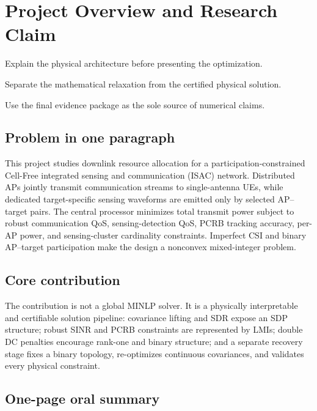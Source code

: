\chapter{Project Overview and Research Claim}

\begin{introduction}
\item Explain the physical architecture before presenting the optimization.
\item Separate the mathematical relaxation from the certified physical solution.
\item Use the final evidence package as the sole source of numerical claims.
\end{introduction}

\section{Problem in one paragraph}
This project studies downlink resource allocation for a participation-constrained
Cell-Free integrated sensing and communication (ISAC) network. Distributed APs
jointly transmit communication streams to single-antenna UEs, while dedicated
target-specific sensing waveforms are emitted only by selected AP--target
pairs. The central processor minimizes total transmit power subject to robust
communication QoS, sensing-detection QoS, PCRB tracking accuracy, per-AP power,
and sensing-cluster cardinality constraints. Imperfect CSI and binary AP--target
participation make the design a nonconvex mixed-integer problem.

\section{Core contribution}
The contribution is not a global MINLP solver. It is a physically interpretable
and certifiable solution pipeline: covariance lifting and SDR expose an SDP
structure; robust SINR and PCRB constraints are represented by LMIs; double DC
penalties encourage rank-one and binary structure; and a separate recovery
stage fixes a binary topology, re-optimizes continuous covariances, and
validates every physical constraint.

\section{One-page oral summary}

